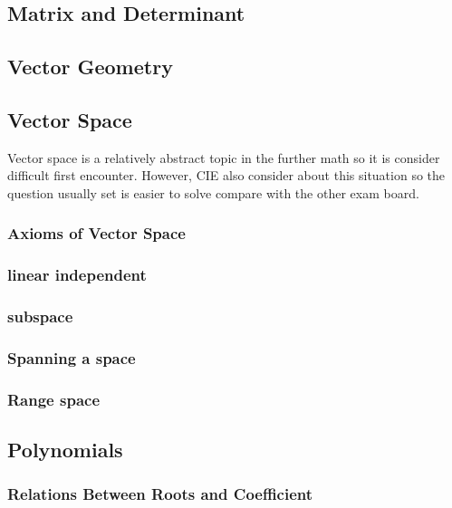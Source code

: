 \documentclass[]{article}
\begin{document}
\subsection{Matrix and Determinant}\label{header-n222}

\subsection{Vector Geometry}\label{header-n224}

\subsection{Vector Space}\label{header-n226}

Vector space is a relatively abstract topic in the further math so it is
consider difficult first encounter. However, CIE also consider about
this situation so the question usually set is easier to solve compare
with the other exam board.

\subsubsection{Axioms of Vector Space}\label{header-n228}

\subsubsection{linear independent}\label{header-n229}

\subsubsection{subspace}\label{header-n230}

\subsubsection{Spanning a space}\label{header-n231}

\subsubsection{Range space}\label{header-n232}

\subsection{Polynomials}\label{header-n234}

\subsubsection{Relations Between Roots and
Coefficient}\label{header-n235}
\end{document}
